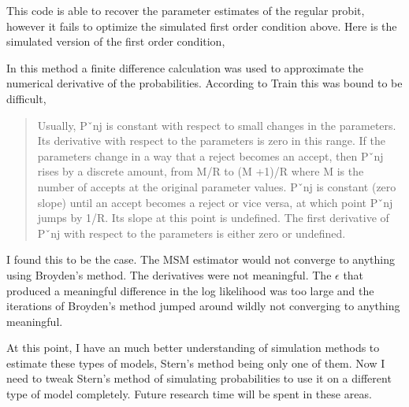 \documentclass[]{article}
\begin{document}
 This code is able to recover the parameter estimates of the regular probit, however it fails to optimize the simulated first order condition above. Here is the simulated version of the first order condition, 
 
 
 
 In this method a finite difference calculation was used to approximate the numerical derivative of the probabilities. According to Train this was bound to be difficult, 
 
 \begin{quotation}
 	Usually, Pˇnj is constant with respect to small changes in the parameters. Its derivative with respect to the parameters is zero in this range. If the parameters change in a way that a reject becomes an accept, then Pˇnj rises by a discrete amount, from M/R to (M +1)/R where M is the number of accepts at the original parameter values. Pˇnj is constant (zero slope) until an accept becomes a reject or vice versa, at which point Pˇnj jumps by 1/R. Its slope at this point is undefined. The first derivative of Pˇnj with respect to the parameters is either zero or undefined.\cite{train}
 \end{quotation}
 
 I found this to be the case. The MSM estimator would not converge to anything using Broyden's method. The derivatives were not meaningful. The $ \epsilon $ that produced a meaningful difference in the log likelihood was too large and the iterations of Broyden's method jumped around wildly not converging to anything meaningful.
 
 At this point, I have an much better understanding of simulation methods to estimate these types of models, Stern's method being only one of them. Now I need to tweak Stern's method of simulating probabilities to use it on a different type of model completely. Future research time will be spent in these areas. 

 
 
  
 
	
\end{document}
